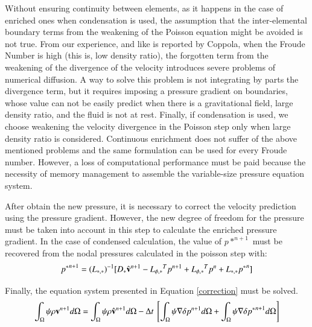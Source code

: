 
Without ensuring continuity between elements, as it happens in the case of enriched ones when condensation is used, the assumption that the inter-elemental boundary terms from the weakening of the Poisson equation might be avoided is not true. From our experience, and like is reported by Coppola\cite{Coppola05}, when the Froude Number is high (this is, low density ratio), the forgotten term from the weakening of the divergence of the velocity introduces severe problems of numerical diffusion. A way to solve this problem is not integrating by parts the divergence term, but it requires imposing a pressure gradient on boundaries, whose value can not be easily predict when there is a gravitational field, large density ratio, and the fluid is not at rest. Finally, if condensation is used, we choose weakening the velocity divergence in the Poisson step only when large density ratio is considered. Continuous enrichment does not suffer of the above mentioned problems and the same formulation can be used for every 
Froude number. However, a loss of computational performance must be paid because the necessity of memory management to assemble the variable-size pressure equation system.


% 

After obtain the new pressure, it is necessary to correct the velocity prediction using the pressure gradient. However, the new degree of freedom for the pressure must be taken into account in this step to calculate the enriched pressure gradient. In the case of condensed calculation, the value of $p*^{n+1}$ must be recovered from the nodal pressures calculated in the poisson step with:
\begin{equation}
  {p^*}^{n+1} = {(L_{*,*})}^{-1}[D_* \hat{\mathbf{v}}^{n+1} - {L_{\phi,*}}^Tp^{n+1} + {L_{\phi,*}}^Tp^{n} + L_{*,*}{p^*}^n]
  \label{recovering}
\end{equation}

Finally, the equation system presented in Equation \ref{correction} must be solved.
 \begin{equation}
  \int_{\Omega} \psi \rho \vv^{n+1} d\Omega = \int_{\Omega} \psi \rho \hat{\vv}^{n+1} d\Omega - \Delta t \ \left[\int_{\Omega} \psi \nabla \delta p^{n+1} d\Omega + \int_{\Omega} \psi \nabla \delta {p^*}^{n+1} d\Omega \right]
  \label{correction}
 \end{equation}


